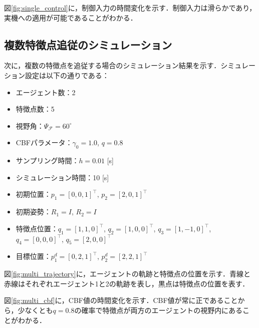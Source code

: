 図\ref{fig:single_control}に，制御入力の時間変化を示す．制御入力は滑らかであり，実機への適用が可能であることがわかる．


\subsection{複数特徴点追従のシミュレーション}

次に，複数の特徴点を追従する場合のシミュレーション結果を示す．シミュレーション設定は以下の通りである：
\begin{itemize}
\item エージェント数：2
\item 特徴点数：5
\item 視野角：$\Psi_\mathcal{F} = 60^\circ$
\item CBFパラメータ：$\gamma_0 = 1.0$, $q = 0.8$
\item サンプリング時間：$h = 0.01$ [s]
\item シミュレーション時間：10 [s]
\item 初期位置：$p_1 = [0, 0, 1]^\top$, $p_2 = [2, 0, 1]^\top$
\item 初期姿勢：$R_1 = I$, $R_2 = I$
\item 特徴点位置：$q_1 = [1, 1, 0]^\top$, $q_2 = [1, 0, 0]^\top$, $q_3 = [1, -1, 0]^\top$, $q_4 = [0, 0, 0]^\top$, $q_5 = [2, 0, 0]^\top$
\item 目標位置：$p_1^d = [0, 2, 1]^\top$, $p_2^d = [2, 2, 1]^\top$
\end{itemize}

図\ref{fig:multi_trajectory}に，エージェントの軌跡と特徴点の位置を示す．青線と赤線はそれぞれエージェント1と2の軌跡を表し，黒点は特徴点の位置を表す．


図\ref{fig:multi_cbf}に，CBF値の時間変化を示す．CBF値が常に正であることから，少なくとも$q = 0.8$の確率で特徴点が両方のエージェントの視野内にあることがわかる．

